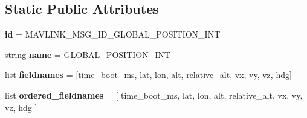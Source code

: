 \subsection*{Static Public Attributes}
\begin{DoxyCompactItemize}
\item 
\mbox{\label{classpymavlink_1_1dialects_1_1v10_1_1MAVLink__global__position__int__message_a202b5620b1165dcb63b54af5be98401d}} 
{\bfseries id} = M\+A\+V\+L\+I\+N\+K\+\_\+\+M\+S\+G\+\_\+\+I\+D\+\_\+\+G\+L\+O\+B\+A\+L\+\_\+\+P\+O\+S\+I\+T\+I\+O\+N\+\_\+\+I\+NT
\item 
\mbox{\label{classpymavlink_1_1dialects_1_1v10_1_1MAVLink__global__position__int__message_a0f936b2bb7131f8e370b8180dc7e540f}} 
string {\bfseries name} = \textquotesingle{}G\+L\+O\+B\+A\+L\+\_\+\+P\+O\+S\+I\+T\+I\+O\+N\+\_\+\+I\+NT\textquotesingle{}
\item 
\mbox{\label{classpymavlink_1_1dialects_1_1v10_1_1MAVLink__global__position__int__message_aa45c118689a1ba92ed62f179f1705681}} 
list {\bfseries fieldnames} = \mbox{[}\textquotesingle{}time\+\_\+boot\+\_\+ms\textquotesingle{}, \textquotesingle{}lat\textquotesingle{}, \textquotesingle{}lon\textquotesingle{}, \textquotesingle{}alt\textquotesingle{}, \textquotesingle{}relative\+\_\+alt\textquotesingle{}, \textquotesingle{}vx\textquotesingle{}, \textquotesingle{}vy\textquotesingle{}, \textquotesingle{}vz\textquotesingle{}, \textquotesingle{}hdg\textquotesingle{}\mbox{]}
\item 
\mbox{\label{classpymavlink_1_1dialects_1_1v10_1_1MAVLink__global__position__int__message_a07e9ccdb04ccce1808a0d44b406243ac}} 
list {\bfseries ordered\+\_\+fieldnames} = \mbox{[} \textquotesingle{}time\+\_\+boot\+\_\+ms\textquotesingle{}, \textquotesingle{}lat\textquotesingle{}, \textquotesingle{}lon\textquotesingle{}, \textquotesingle{}alt\textquotesingle{}, \textquotesingle{}relative\+\_\+alt\textquotesingle{}, \textquotesingle{}vx\textquotesingle{}, \textquotesingle{}vy\textquotesingle{}, \textquotesingle{}vz\textquotesingle{}, \textquotesingle{}hdg\textquotesingle{} \mbox{]}

\end{DoxyCompactItemize}
